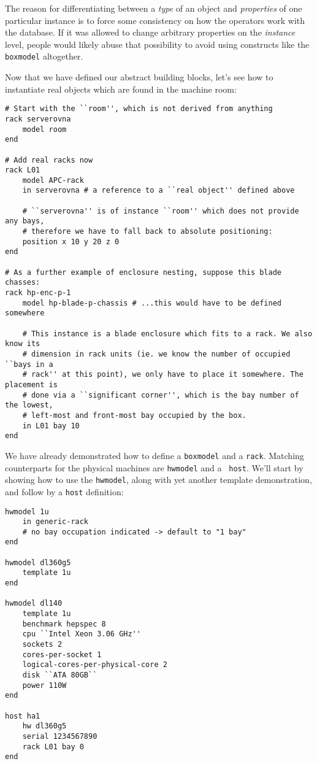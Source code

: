 \documentclass[11pt]{article}
\begin{document}
The reason for differentiating between a {\em type} of an object and {\em
properties} of one particular instance is to force some consistency on how the
operators work with the database.  If it was allowed to change arbitrary
properties on the {\em instance} level, people would likely abuse that
possibility to avoid using constructs like the {\tt boxmodel} altogether.

Now that we have defined our abstract building blocks, let's see how to
instantiate real objects which are found in the machine room:

{\scriptsize
\begin{verbatim}
# Start with the ``room'', which is not derived from anything
rack serverovna
    model room
end

# Add real racks now
rack L01
    model APC-rack
    in serverovna # a reference to a ``real object'' defined above

    # ``serverovna'' is of instance ``room'' which does not provide any bays,
    # therefore we have to fall back to absolute positioning:
    position x 10 y 20 z 0
end

# As a further example of enclosure nesting, suppose this blade chasses:
rack hp-enc-p-1
    model hp-blade-p-chassis # ...this would have to be defined somewhere

    # This instance is a blade enclosure which fits to a rack. We also know its
    # dimension in rack units (ie. we know the number of occupied ``bays in a
    # rack'' at this point), we only have to place it somewhere. The placement is
    # done via a ``significant corner'', which is the bay number of the lowest,
    # left-most and front-most bay occupied by the box.
    in L01 bay 10
end
\end{verbatim}
}

We have already demonstrated how to define a {\tt boxmodel} and a {\tt rack}.
Matching counterparts for the physical machines are {\tt hwmodel} and a {\tt
host}.  We'll start by showing how to use the {\tt hwmodel}, along with yet
another template demonstration, and follow by a {\tt host} definition:

{\scriptsize
\begin{verbatim}
hwmodel 1u
    in generic-rack
    # no bay occupation indicated -> default to "1 bay"
end

hwmodel dl360g5
    template 1u
end

hwmodel dl140
    template 1u
    benchmark hepspec 8
    cpu ``Intel Xeon 3.06 GHz''
    sockets 2
    cores-per-socket 1
    logical-cores-per-physical-core 2
    disk ``ATA 80GB``
    power 110W
end

host ha1
    hw dl360g5
    serial 1234567890
    rack L01 bay 0
end
\end{verbatim}
}
\end{document}

